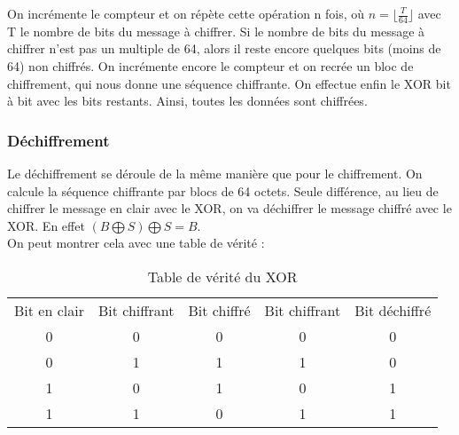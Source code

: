 On incrémente le compteur et on répète cette opération n fois, où $n= \lfloor{\frac{T}{64}}\rfloor$ avec T le nombre de bits du message à chiffrer. Si le nombre de bits du message à chiffrer n'est pas un multiple de 64, alors il reste encore quelques bits (moins de 64) non chiffrés. On incrémente encore le compteur et on recrée un bloc de chiffrement, qui nous donne une séquence chiffrante. On effectue enfin le XOR bit à bit avec les bits restants. Ainsi, toutes les données sont chiffrées.

\subsubsection{Déchiffrement}
Le déchiffrement se déroule de la même manière que pour le chiffrement. On calcule la séquence chiffrante par blocs de 64 octets. Seule différence, au lieu de chiffrer le message en clair avec le XOR, on va déchiffrer le message chiffré avec le XOR. En effet $(B \bigoplus S) \bigoplus S = B$. \cite{nir_chacha20_2015} \\
On peut montrer cela avec une table de vérité :
\begin{table}[H]
    \centering
    \begin{tabular}{c|c|c|c||c}
        Bit en clair & Bit chiffrant & Bit chiffré & Bit chiffrant & Bit déchiffré\\
        0 & 0 & 0 & 0 & 0\\
        0 & 1 & 1 & 1 & 0\\
        1 & 0 & 1 & 0 & 1\\
        1 & 1 & 0 & 1 & 1\\
    \end{tabular}
    \caption{Table de vérité du XOR}
\end{table}